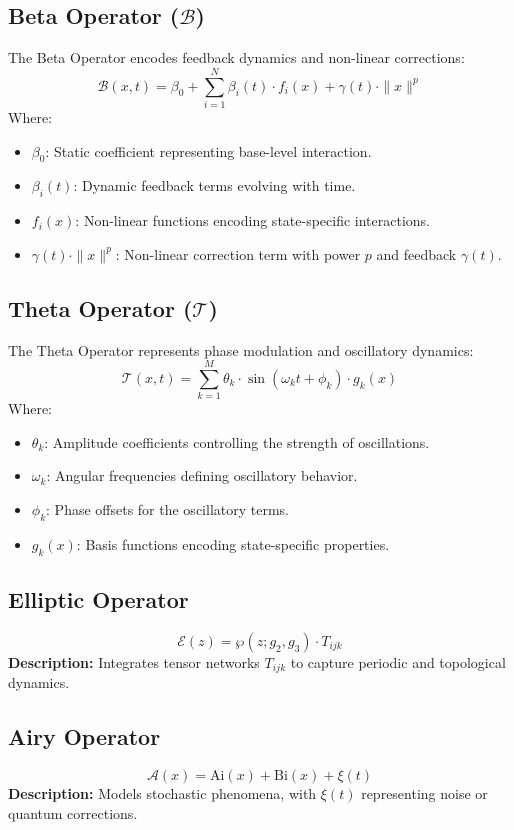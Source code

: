 \documentclass{article}
\theoremstyle{plain}
\begin{document}
\subsection{Beta Operator (\( \mathcal{B} \))}
The Beta Operator encodes feedback dynamics and non-linear corrections:
\[
\mathcal{B}(x, t) = \beta_0 + \sum_{i=1}^N \beta_i(t) \cdot f_i(x) + \gamma(t) \cdot \|x\|^p
\]
Where:
\begin{itemize}
    \item \( \beta_0 \): Static coefficient representing base-level interaction.
    \item \( \beta_i(t) \): Dynamic feedback terms evolving with time.
    \item \( f_i(x) \): Non-linear functions encoding state-specific interactions.
    \item \( \gamma(t) \cdot \|x\|^p \): Non-linear correction term with power \( p \) and feedback \( \gamma(t) \).
\end{itemize}

\subsection{Theta Operator (\( \mathcal{T} \))}
The Theta Operator represents phase modulation and oscillatory dynamics:
\[
\mathcal{T}(x, t) = \sum_{k=1}^M \theta_k \cdot \sin(\omega_k t + \phi_k) \cdot g_k(x)
\]
Where:
\begin{itemize}
    \item \( \theta_k \): Amplitude coefficients controlling the strength of oscillations.
    \item \( \omega_k \): Angular frequencies defining oscillatory behavior.
    \item \( \phi_k \): Phase offsets for the oscillatory terms.
    \item \( g_k(x) \): Basis functions encoding state-specific properties.
\end{itemize}

\subsection{Elliptic Operator}
\[
\mathcal{E}(z) = \wp(z; g_2, g_3) \cdot T_{ijk}
\]
\textbf{Description:} Integrates tensor networks $T_{ijk}$ to capture periodic and topological dynamics.

\subsection{Airy Operator}
\[
\mathcal{A}(x) = \text{Ai}(x) + \text{Bi}(x) + \xi(t)
\]
\textbf{Description:} Models stochastic phenomena, with $\xi(t)$ representing noise or quantum corrections.
\end{document}
